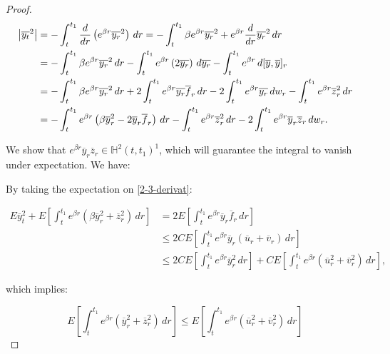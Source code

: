 \begin{theorem}
\begin{proof}
        \begin{align}\label{2-3-derivat}
            \abs{\overline{y_t}^2} & = -\int_t^{t_1} \frac{d}{dr}\left(e^{\beta r}\overline{y_r}^2\right) \,dr = - \int_t^{t_1} \beta e^{\beta r}\overline{y_r}^2 + e^{\beta r}\frac{d}{dr}\overline{y_r}^2 \,dr\\
            & = - \int_t^{t_1} \beta e^{\beta r}\overline{y_r}^2 \,dr - \int_t^{t_1} e^{\beta r}\left(2\overline{y_r}\right)\,d\overline{y_r} - \int_t^{t_1} e^{\beta r}\,d[\overline{y},\overline{y}]_r \\
            & = - \int_t^{t_1} \beta e^{\beta r}\overline{y_r}^2 \,dr + 2\int_t^{t_1} e^{\beta r}\overline{y_r}\overline{f}_r\,dr - 2\int_t^{t_1} e^{\beta r}\overline{y_r}\,dw_r - \int_t^{t_1} e^{\beta r}\overline{z}_r^2\,dr \\
            & = - \int_t^{t_1} e^{\beta r}\left(\beta\overline{y}_r^2-2\overline{y}_r\overline{f}_r\right)\,dr - \int_t^{t_1}e^{\beta r}\overline{z}_r^2\,dr - 2\int_t^{t_1}e^{\beta r}\overline{y}_r\overline{z}_r\,dw_r.
        \end{align}

        We show that $e^{\beta r}\overline{y}_r\overline{z}_r\in\mathbb{H}^2(t,t_1)^1$, which will guarantee the integral to vanish under expectation. We have:

        
        \color{black}{}
        By taking the expectation on \ref{2-3-derivat}:
        
        \begin{align}
            E\overline{y}_t^2 + E\left[\int_t^{t_1}e^{\beta r} \left(\beta\overline{y}_r^2+\overline{z}_r^2\right)\,dr\right] & = 2E\left[\int_t^{t_1}e^{\beta r}\overline{y}_r\overline{f}_r\,dr\right] \\
            & \leq 2CE\left[\int_t^{t_1}e^{\beta r}\overline{y}_r\left(\overline{u}_r+\overline{v}_r\right)\,dr\right] \\
            & \leq 2CE\left[\int_t^{t_1}e^{\beta r}\overline{y}_r^2\,dr\right] + CE\left[\int_t^{t_1}e^{\beta r}\left(\overline{u}_r^2+\overline{v}_r^2\right)\,dr\right], 
        \end{align}

        which implies:

        \[E\left[\int_t^{t_1}e^{\beta r} \left(\overline{y}_r^2+\overline{z}_r^2\right)\,dr\right] \leq E\left[\int_t^{t_1}e^{\beta r} \left(\overline{u}_r^2+\overline{v}_r^2\right)\,dr\right]\]
    \end{proof}
\end{theorem}

